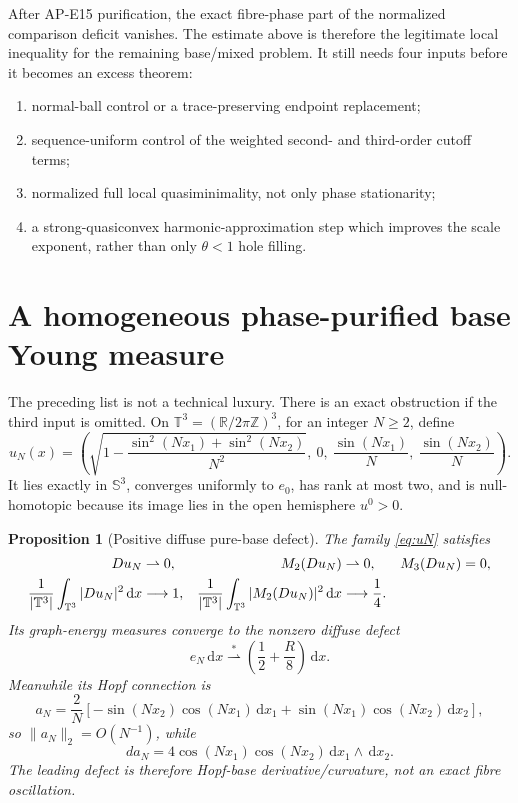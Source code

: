 \documentclass[10pt]{article}
\newtheorem{proposition}[theorem]{Proposition}
\newcommand{\dd}{\,\mathrm d}
\newcommand{\RR}{\mathbb R}
\newcommand{\SSS}{\mathbb S}
\newcommand{\TT}{\mathbb T}
\begin{document}
After AP-E15 purification, the exact fibre-phase part of the normalized
comparison deficit vanishes.  The estimate above is therefore the legitimate
local inequality for the remaining base/mixed problem.  It still needs four
inputs before it becomes an excess theorem:
\begin{enumerate}
 \item normal-ball control or a trace-preserving endpoint replacement;
 \item sequence-uniform control of the weighted second- and third-order
       cutoff terms;
 \item normalized full local quasiminimality, not only phase stationarity;
 \item a strong-quasiconvex harmonic-approximation step which improves the
       scale exponent, rather than only $\theta<1$ hole filling.
\end{enumerate}

\section{A homogeneous phase-purified base Young measure}

The preceding list is not a technical luxury.  There is an exact obstruction
if the third input is omitted.  On $\TT^3=(\RR/2\pi\mathbb Z)^3$, for an
integer $N\geq2$, define
\begin{equation}
 u_N(x)=\left(
 \sqrt{1-\frac{\sin^2(Nx_1)+\sin^2(Nx_2)}{N^2}},\
 0,\
 \frac{\sin(Nx_1)}N,\
 \frac{\sin(Nx_2)}N
 \right).
 \label{eq:uN}
\end{equation}
It lies exactly in $\SSS^3$, converges uniformly to $e_0$, has rank at most
two, and is null-homotopic because its image lies in the open hemisphere
$u^0>0$.

\begin{proposition}[Positive diffuse pure-base defect]
The family \eqref{eq:uN} satisfies
\begin{align}
 Du_N&\rightharpoonup0,&
 M_2(Du_N)&\rightharpoonup0,&M_3(Du_N)&=0,\notag\\
 \frac1{|\TT^3|}\int_{\TT^3}|Du_N|^2\dd x&\longrightarrow1,&
 \frac1{|\TT^3|}\int_{\TT^3}|M_2(Du_N)|^2\dd x
 &\longrightarrow\frac14.
 \label{eq:uN-limits}
\end{align}
Its graph-energy measures converge to the nonzero diffuse defect
\begin{equation}
 e_N\dd x\stackrel{*}{\rightharpoonup}
 \left(\frac12+\frac R8\right)\dd x.
 \label{eq:diffuse-defect}
\end{equation}
Meanwhile its Hopf connection is
\begin{equation}
 a_N=\frac2N\left[
 -\sin(Nx_2)\cos(Nx_1)\dd x_1
 +\sin(Nx_1)\cos(Nx_2)\dd x_2\right],
 \label{eq:aN}
\end{equation}
so $\|a_N\|_2=O(N^{-1})$, while
\begin{equation}
 da_N=4\cos(Nx_1)\cos(Nx_2)\dd x_1\wedge\dd x_2.
 \label{eq:daN}
\end{equation}
The leading defect is therefore Hopf-base derivative/curvature, not an exact
fibre oscillation.
\end{proposition}
\end{document}
